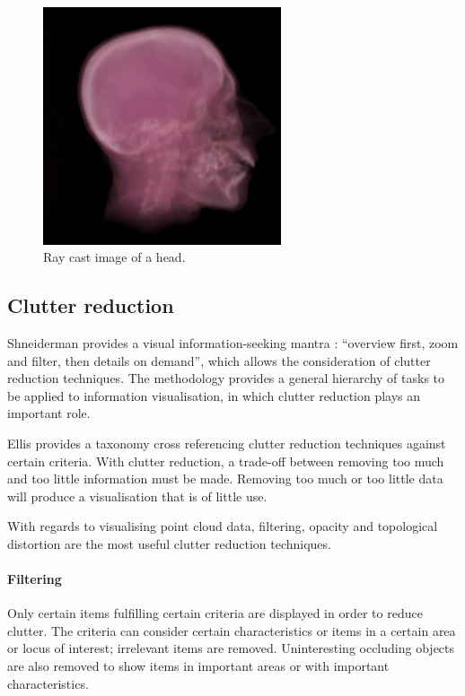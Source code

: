 \begin{figure}[h!]
  \begin{center}
    \includegraphics[width=70mm]{head_volume}
  \end{center}
  \caption{Ray cast image of a head.}
  \label{fig:background_head}
\end{figure}


\subsection{Clutter reduction}
\label{sub:background_clutter}

Shneiderman provides a visual information-seeking mantra \citep{shneiderman96}:
``overview first, zoom and filter, then details on demand'', which allows the
consideration of clutter reduction techniques. The methodology provides a
general hierarchy of tasks to be applied to information visualisation, in which
clutter reduction plays an important role.

Ellis \citet{ellis07} provides a taxonomy cross referencing clutter reduction
techniques against certain criteria. With clutter reduction, a trade-off
between removing too much and too little information must be made. Removing too
much or too little data will produce a visualisation that is of little use.

With regards to visualising point cloud data, filtering, opacity and topological
distortion are the most useful clutter reduction techniques.

\paragraph{Filtering} Only certain items fulfilling certain criteria are
displayed in order to reduce clutter. The criteria can consider certain
characteristics or items in a certain area or locus of interest; irrelevant
items are removed. Uninteresting occluding objects are also removed to show
items in important areas or with important characteristics.

